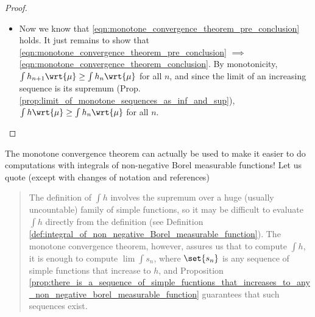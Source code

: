\documentclass{article} %
\begin{document}
\begin{proof}
\begin{itemize}
So
\begin{align*}
 \ds\int h_n  \stackreltext{monotonicity}{\geq} \ds\int_{A_n} h_n \stackreltext{def. $A_n$, monotonicity}{\geq} \ds\int_{A_n} \alpha s \stackreltext{linearity}{=} \alpha   \ds\int_{A_n} s 
 \labelit \label{eqn:intermediate_eqn_from_proof_mct} 
 \end{align*}
   Now we recognize the right hand side as a measure on $A_n$, and since $A_n \uparrow \Omega$, we can apply continuity from below (see Remark \ref{rk:continuity_of_measure_applied_to_measures_given_by_integrals_of_simple_functions_over_sets}), so taking the limit as $n \to \infty$, Equation \eqref{eqn:intermediate_eqn_from_proof_mct} becomes
\[  \ds\lim_{n \to \infty} \ds\int h_n  \geq \alpha \ds\int s \]
Now since the equality holds for all $\alpha <1$, it holds for $\alpha =1$, and so we have
\[   \ds\lim_{n \to \infty}  \ds\int h_n  \geq \ds\int s \]
Since the LHS is an upper bound on the set in the RHS, it must be greater than the least upper bound, so 
\[   \ds\lim_{n \to \infty}  \ds\int h_n  \geq \ds\int h \]
\item Now we know that \eqref{eqn:monotone_convergence_theorem_pre_conclusion} holds.  It just remains to show that \eqref{eqn:monotone_convergence_theorem_pre_conclusion} $\implies$ \eqref{eqn:monotone_convergence_theorem_conclusion}.  By monotonicity, $\int h_{n+1} \wrt{\mu}  \geq \int h_{n} \wrt{\mu}$ for all $n$, and since the limit of an increasing sequence is its supremum (Prop. \ref{prop:limit_of_monotone_sequences_as_inf_and_sup}), $\int h \wrt{\mu}  \geq \int h_{n} \wrt{\mu}$ for all $n$.
\end{itemize}
\end{proof}


\begin{remark}{}
The monotone convergence theorem can actually be used to make it easier to do computations with integrals of non-negative Borel measurable functions!  Let us quote \cite{folland1999real} (except with changes of notation and references)

\begin{quotation}
 The definition of $\int h$  involves the supremum over a huge (usually uncountable) family of simple functions, so it may be difficult to evaluate $\int h$ directly from the definition (see Definition \ref{def:integral_of_non_negative_Borel_measurable_function}).  The monotone convergence theorem, however, assures us that to compute $\int h$, it is enough to compute $\lim \int s_n$, where $\set{s_n}$ is any sequence of simple functions that increase to $h$, and Proposition \ref{prop:there_is_a_sequence_of_simple_fucntions_that_increases_to_any_non_negative_borel_measurable_function} guarantees that such sequences exist. 
\end{quotation}
\end{remark}
\end{document}
